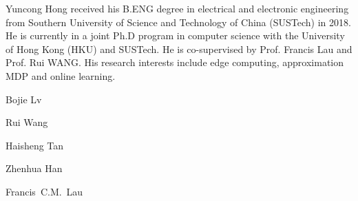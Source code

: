 
\begin{IEEEbiography}{Yuncong Hong}
    received his B.ENG degree in electrical and electronic engineering from Southern University of Science and Technology of China (SUSTech) in 2018. He is currently in a joint Ph.D program in computer science with the University of Hong Kong (HKU) and SUSTech. He is co-supervised by Prof. Francis Lau and Prof. Rui WANG. His research interests include edge computing, approximation MDP and online learning.
\end{IEEEbiography}

\begin{IEEEbiography}{Bojie Lv}
\end{IEEEbiography}

\begin{IEEEbiography}{Rui Wang}
\end{IEEEbiography}

\begin{IEEEbiography}{Haisheng Tan}
\end{IEEEbiography}

\begin{IEEEbiography}{Zhenhua Han}
\end{IEEEbiography}

\begin{IEEEbiography}{Francis~C.M.~Lau}
\end{IEEEbiography}

